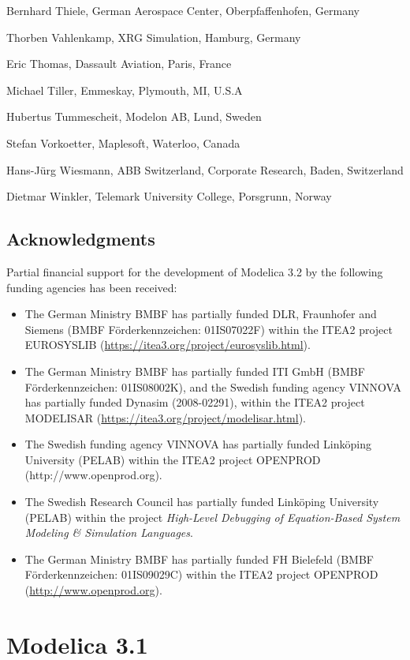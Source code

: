 Bernhard Thiele, German Aerospace Center, Oberpfaffenhofen, Germany

Thorben Vahlenkamp, XRG Simulation, Hamburg, Germany

Eric Thomas, Dassault Aviation, Paris, France

Michael Tiller, Emmeskay, Plymouth, MI, U.S.A

Hubertus Tummescheit, Modelon AB, Lund, Sweden

Stefan Vorkoetter, Maplesoft, Waterloo, Canada

Hans-Jürg Wiesmann, ABB Switzerland, Corporate Research, Baden,
Switzerland

Dietmar Winkler, Telemark University College, Porsgrunn, Norway

\subsection{Acknowledgments}\label{acknowledgments2}

Partial financial support for the development of Modelica 3.2 by the
following funding agencies has been received:
\begin{itemize}
\item
  The German Ministry BMBF has partially funded DLR, Fraunhofer and
  Siemens (BMBF Förderkennzeichen: 01IS07022F) within the ITEA2 project
  EUROSYSLIB (\url{https://itea3.org/project/eurosyslib.html}).
\item
  The German Ministry BMBF has partially funded ITI GmbH (BMBF
  Förderkennzeichen: 01IS08002K), and the Swedish funding agency VINNOVA
  has partially funded Dynasim (2008-02291), within the ITEA2 project
  MODELISAR (\url{https://itea3.org/project/modelisar.html}).
\item
  The Swedish funding agency VINNOVA has partially funded Linköping
  University (PELAB) within the ITEA2 project OPENPROD
  (http://www.openprod.org).
\item
  The Swedish Research Council has partially funded Linköping University
  (PELAB) within the project \emph{High-Level Debugging of Equation-Based
  System Modeling \& Simulation Languages}.
\item
  The German Ministry BMBF has partially funded FH Bielefeld (BMBF
  Förderkennzeichen: 01IS09029C) within the ITEA2 project OPENPROD
  (\href{http://www.openprod.}{http://www.openprod.org}).
\end{itemize}

\section{Modelica 3.1}\label{modelica-3-1}

